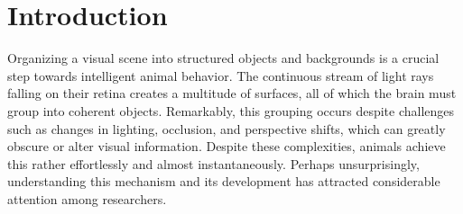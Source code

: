 \documentclass[10pt,letterpaper]{article}
\begin{document}
\section{Introduction}

Organizing a visual scene into structured objects and backgrounds is a crucial step towards intelligent animal behavior. The continuous stream of light rays falling on their retina creates a multitude of surfaces, all of which the brain must group into coherent objects. Remarkably, this grouping occurs despite challenges such as changes in lighting, occlusion, and perspective shifts, which can greatly obscure or alter visual information. Despite these complexities, animals achieve this rather effortlessly and almost instantaneously. Perhaps unsurprisingly, understanding this mechanism and its development has attracted considerable attention among researchers.
\end{document}

